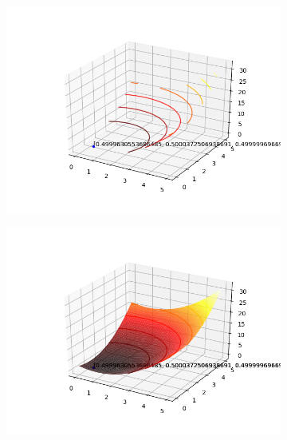 \documentclass[a4paper, 12pt]{article}
\begin{document}
\begin{figure}[H]
\centering
\begin{subfigure}{0.3\textwidth}
  \centering
  \includegraphics[width=\linewidth]{1/D/x-1x1/contorno.png}
\end{subfigure}%
\begin{subfigure}{0.3\textwidth}
  \centering
  \includegraphics[width=\linewidth]{1/D/x-1x1/superficie.png}
\end{subfigure}
\begin{subfigure}{0.3\textwidth}
  \centering

\end{subfigure}
\end{figure}
\end{document}
